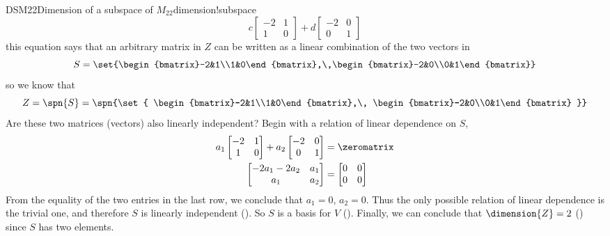 \begin{example}{DSM22}{Dimension of a subspace of $M_{22}$}{dimension!subspace}
\begin{equation*}
%
c\begin{bmatrix}-2&1\\1&0\end{bmatrix}+
d\begin{bmatrix}-2&0\\0&1\end{bmatrix}
%
\end{equation*}
%
this equation says that an arbitrary matrix in $Z$ can be written as a linear combination of the two vectors in
%
\begin{equation*}
S=\set{\begin{bmatrix}-2&1\\1&0\end{bmatrix},\,\begin{bmatrix}-2&0\\0&1\end{bmatrix}}
\end{equation*}
%
so we know that
%
\begin{equation*}
Z=\spn{S}=
\spn{\set{
\begin{bmatrix}-2&1\\1&0\end{bmatrix},\,
\begin{bmatrix}-2&0\\0&1\end{bmatrix}
}}
\end{equation*}
%
Are these two matrices (vectors) also linearly independent?  Begin with a relation of linear dependence on $S$,
%
\begin{align*}
a_1\begin{bmatrix}-2&1\\1&0\end{bmatrix}+
a_2\begin{bmatrix}-2&0\\0&1\end{bmatrix}&=\zeromatrix\\
\begin{bmatrix}-2a_1-2a_2&a_1\\a_1&a_2\end{bmatrix}&=
\begin{bmatrix}0&0\\0&0\end{bmatrix}
\end{align*}
%
From the equality of the two entries in the last row, we conclude that $a_1=0$, $a_2=0$.  Thus the only possible relation of linear dependence is the trivial one, and therefore $S$ is linearly independent ().  So $S$ is a basis for $V$ ().  Finally, we can conclude that $\dimension{Z}=2$ () since $S$ has two elements.
%
\end{example}
